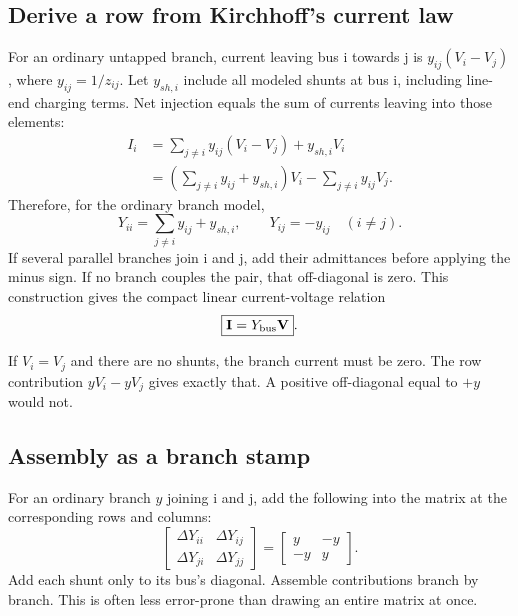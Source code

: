 \documentclass[11pt,a4paper]{article}
\newenvironment{Idea}[1]{\begin{tcolorbox}[colback=pale,colframe=teal,coltitle=white,title={#1}]}{\end{tcolorbox}}
\begin{document}
\subsection{Derive a row from Kirchhoff's current law}
For an ordinary untapped branch, current leaving bus i towards j is $y_{ij}(V_i-V_j)$, where $y_{ij}=1/z_{ij}$. Let $y_{sh,i}$ include all modeled shunts at bus i, including line-end charging terms. Net injection equals the sum of currents leaving into those elements:
\begin{align*}
I_i&=\sum_{j\ne i}y_{ij}(V_i-V_j)+y_{sh,i}V_i\\
&=\left(\sum_{j\ne i}y_{ij}+y_{sh,i}\right)V_i-\sum_{j\ne i}y_{ij}V_j.
\end{align*}
Therefore, for the ordinary branch model,
\[
\boxed{Y_{ii}=\sum_{j\ne i}y_{ij}+y_{sh,i}},\qquad
\boxed{Y_{ij}=-y_{ij}\quad(i\ne j)}.
\]
If several parallel branches join i and j, add their admittances before applying the minus sign. If no branch couples the pair, that off-diagonal is zero. This construction gives the compact linear current-voltage relation
\[
\boxed{\mathbf I=Y_{\rm bus}\mathbf V}.
\]
\begin{Idea}{An easy physical check on the minus sign}
If $V_i=V_j$ and there are no shunts, the branch current must be zero. The row contribution $yV_i-yV_j$ gives exactly that. A positive off-diagonal equal to $+y$ would not.
\end{Idea}
\subsection{Assembly as a branch stamp}
For an ordinary branch $y$ joining i and j, add the following into the matrix at the corresponding rows and columns:
\[
\begin{bmatrix}\Delta Y_{ii}&\Delta Y_{ij}\\\Delta Y_{ji}&\Delta Y_{jj}\end{bmatrix}
=\begin{bmatrix}y&-y\\-y&y\end{bmatrix}.
\]
Add each shunt only to its bus's diagonal. Assemble contributions branch by branch. This is often less error-prone than drawing an entire matrix at once.
\end{document}
